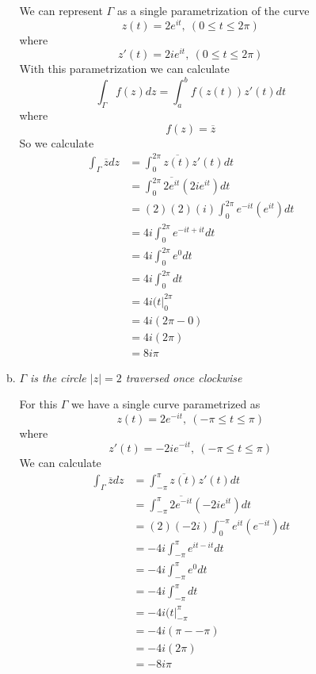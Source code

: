 \documentclass[11pt]{article}
\newcommand{\zbar}{\overline{z}}
\begin{document}
\begin{enumerate}
\begin{enumerate}[(i)]
\begin{enumerate}[(a)]
We can represent $\Gamma$ as a single parametrization of the curve
$$z(t) = 2e^{it},\ (0\le t\le 2\pi)$$
where
$$z'(t) = 2ie^{it},\ (0\le t\le 2\pi)$$
With this parametrization we can calculate
$$\int_{\Gamma} f(z) dz = \int_a^b f(z(t))z'(t)dt$$
where $$f(z) = \zbar$$
So we calculate
\begin{align*}
\int_{\Gamma} \zbar dz &= \int_0^{2\pi} \overline{z(t)}z'(t)dt\\
&= \int_0^{2\pi} \overline{2e^{it}}\left(2ie^{it}\right)dt\\
&= (2)(2)(i)\int_0^{2\pi} e^{-it}\left(e^{it}\right)dt\\
&= 4i\int_0^{2\pi} e^{-it+it}dt\\
&= 4i\int_0^{2\pi} e^0dt\\
&= 4i\int_0^{2\pi} dt\\
&= 4i(t|_0^{2\pi}\\
&= 4i(2\pi-0)\\
&= 4i(2\pi)\\
&= 8i\pi
\end{align*}
\item \textit{$\Gamma$ is the circle $|z|=2$ traversed once clockwise}

For this $\Gamma$ we have a single curve parametrized as
$$z(t) = 2e^{-it},\ (-\pi\le t\le \pi)$$
where
$$z'(t) = -2ie^{-it},\ (-\pi\le t\le \pi)$$
We can calculate
\begin{align*}
\int_{\Gamma} \zbar dz &= \int_{-\pi}^{\pi} \overline{z(t)}z'(t)dt\\
&= \int_{-\pi}^{\pi} \overline{2e^{-it}}\left(-2ie^{it}\right)dt\\
&= (2)(-2i)\int_0^{-\pi} e^{it}\left(e^{-it}\right)dt\\
&= -4i\int_{-\pi}^{\pi} e^{it-it}dt\\
&= -4i\int_{-\pi}^{\pi} e^0dt\\
&= -4i\int_{-\pi}^{\pi} dt\\
&= -4i(t|_{-\pi}^{\pi}\\
&= -4i(\pi-{-\pi})\\
&= -4i(2\pi)\\
&= -8i\pi
\end{align*}


\end{enumerate}
\end{enumerate}
\end{enumerate}
\end{document}
